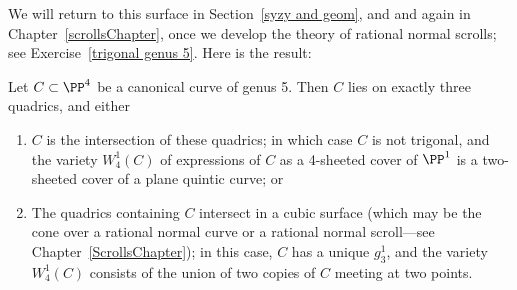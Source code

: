 We will return to this surface in Section~\ref{syzy and geom}, and and again in Chapter~\ref{scrollsChapter}, once we develop the theory of rational normal scrolls; see Exercise~\ref{trigonal genus 5}.
Here is the result:

\begin{theorem}
Let $C \subset \PP^4$ be a canonical curve of genus 5. Then $C$ lies on exactly three quadrics, and either
\begin{enumerate}
\item $C$ is the intersection of these quadrics; in which case $C$ is not trigonal, and the variety $W^1_4(C)$ of expressions of $C$ as a 4-sheeted cover of $\PP^1$ is a two-sheeted cover of a plane quintic curve; or
\item The quadrics containing $C$ intersect in a cubic surface (which may be the cone over a rational normal curve
or a rational normal scroll---see Chapter~\ref{ScrollsChapter}); in this case, $C$ has a unique $g^1_3$, and the variety $W^1_4(C)$ consists of the union of two copies of $C$ meeting at two points.
\end{enumerate}
\end{theorem}


